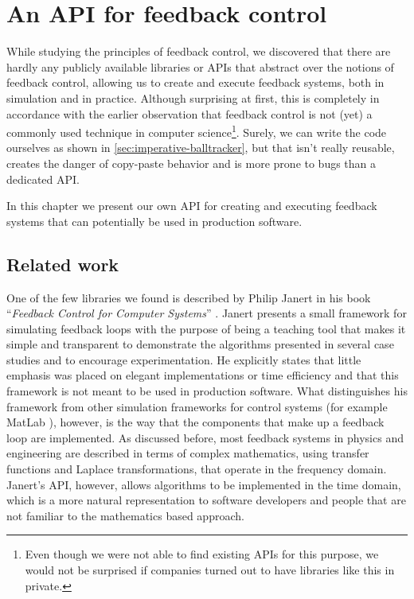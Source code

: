 \chapter{An API for feedback control}

While studying the principles of feedback control, we discovered that there are hardly any publicly available libraries or APIs that abstract over the notions of feedback control, allowing us to create and execute feedback systems, both in simulation and in practice. Although surprising at first, this is completely in accordance with the earlier observation that feedback control is not (yet) a commonly used technique in computer science\footnote{Even though we were not able to find existing APIs for this purpose, we would not be surprised if companies turned out to have libraries like this in private.}. Surely, we can write the code ourselves as shown in \cref{sec:imperative-balltracker}, but that isn't really reusable, creates the danger of copy-paste behavior and is more prone to bugs than a dedicated API.

In this chapter we present our own API for creating and executing feedback systems that can potentially be used in production software. 

\section{Related work}
One of the few libraries we found is described by Philip Janert in his book ``\textit{Feedback Control for Computer Systems}'' \cite{janert2013-feedback}. Janert presents a small framework for simulating feedback loops with the purpose of being a teaching tool that makes it simple and transparent to demonstrate the algorithms presented in several case studies and to encourage experimentation. He explicitly states that little emphasis was placed on elegant implementations or time efficiency and that this framework is not meant to be used in production software. What distinguishes his framework from other simulation frameworks for control systems (for example MatLab ), however, is the way that the components that make up a feedback loop are implemented. As discussed before, most feedback systems in physics and engineering are described in terms of complex mathematics, using transfer functions and Laplace transformations, that operate in the frequency domain. Janert's API, however, allows algorithms to be implemented in the time domain, which is a more natural representation to software developers and people that are not familiar to the mathematics based approach.

